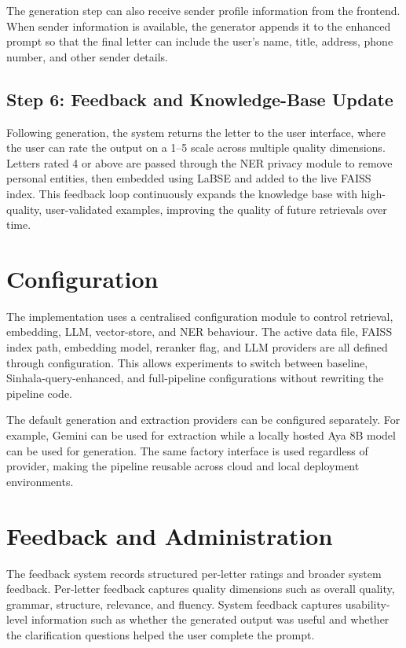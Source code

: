 \documentclass[12pt]{uomthesis}
\begin{document}
The generation step can also receive sender profile information from the frontend. When sender information is available, the generator appends it to the enhanced prompt so that the final letter can include the user's name, title, address, phone number, and other sender details.

\subsection{Step 6: Feedback and Knowledge-Base Update}

Following generation, the system returns the letter to the user interface, where the user can rate the output on a 1–5 scale across multiple quality dimensions. Letters rated 4 or above are passed through the NER privacy module to remove personal entities, then embedded using LaBSE and added to the live FAISS index. This feedback loop continuously expands the knowledge base with high-quality, user-validated examples, improving the quality of future retrievals over time.

\section{Configuration}

The implementation uses a centralised configuration module to control retrieval, embedding, LLM, vector-store, and NER behaviour. The active data file, FAISS index path, embedding model, reranker flag, and LLM providers are all defined through configuration. This allows experiments to switch between baseline, Sinhala-query-enhanced, and full-pipeline configurations without rewriting the pipeline code.

The default generation and extraction providers can be configured separately. For example, Gemini can be used for extraction while a locally hosted Aya 8B model can be used for generation. The same factory interface is used regardless of provider, making the pipeline reusable across cloud and local deployment environments.

\section{Feedback and Administration}

The feedback system records structured per-letter ratings and broader system feedback. Per-letter feedback captures quality dimensions such as overall quality, grammar, structure, relevance, and fluency. System feedback captures usability-level information such as whether the generated output was useful and whether the clarification questions helped the user complete the prompt.
\end{document}
